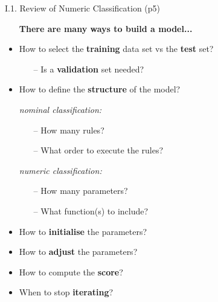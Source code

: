 \documentclass[handout]{beamer}
\newcommand{\strong}[1]{\textbf{\color{teal} #1}}
\begin{document}
\begin{frame}{I.1. Review of Numeric Classification (p5)}
\begin{itemize}
\item[] \textbf{There are many ways to build a model...}
\item How to select the \strong{training} data set vs the \strong{test} set?
	\begin{itemize}
	\item[--] Is a \strong{validation} set needed?
	\end{itemize}
\item How to define the \strong{structure} of the model?
\item[] \emph{nominal classification:}
	\begin{itemize}
	\item[--] How many rules?
	\item[--] What order to execute the rules?
	\end{itemize}
\item[] \emph{numeric classification:}
	\begin{itemize}
	\item[--] How many parameters? 
	\item[--] What function(s) to include?
	\end{itemize}
\item How to \strong{initialise} the parameters?
\item How to \strong{adjust} the parameters?
\item How to compute the \strong{score}?
\item When to stop \strong{iterating}?
\end{itemize}
\end{frame}
\end{document}
